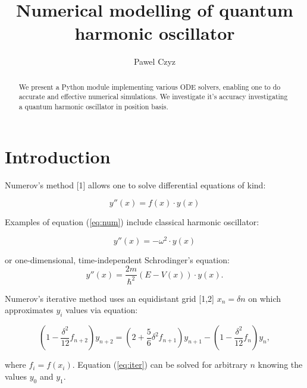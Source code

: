 \documentclass{llncs}
\begin{document}
\title{Numerical modelling of quantum harmonic oscillator}
\author{Pawel Czyz}



\maketitle

\begin{abstract}
We present a Python module implementing various ODE solvers, enabling one to do accurate and effective numerical simulations. We investigate it's accuracy investigating a quantum harmonic oscillator in position basis.

\end{abstract}

\section{Introduction}
Numerov's method [1] allows one to solve differential equations of kind:

\begin{equation}
\label{eq:num}
	y''(x) = f(x)\cdot y(x)
\end{equation}

Examples of equation (\ref{eq:num}) include classical harmonic oscillator:

\begin{equation}
\label{eq:harm}
	y''(x) = -\omega^2\cdot y(x)
\end{equation}

or one-dimensional, time-independent Schrodinger's equation:
\begin{equation}
\label{eq:quant}
	y''(x)=\frac{2m}{\hbar^2}(E-V(x))\cdot y(x).
\end{equation}

Numerov's iterative method uses an equidistant grid [1,2] $x_n=\delta n$ on which approximates $y_i$ values via equation:

\begin{equation}
\label{eq:iter}
	\left(1-\frac {\delta^2}{12}f_{n+2}\right)y_{n+2}=\left(2+\frac 56\delta^2 f_{n+1}\right)y_{n+1}-\left(1-\frac{\delta^2}{12}f_n\right)y_n,
\end{equation}

where $f_i=f(x_i)$. Equation (\ref{eq:iter}) can be solved for arbitrary $n$ knowing the values $y_0$ and $y_1$.
\end{document}
